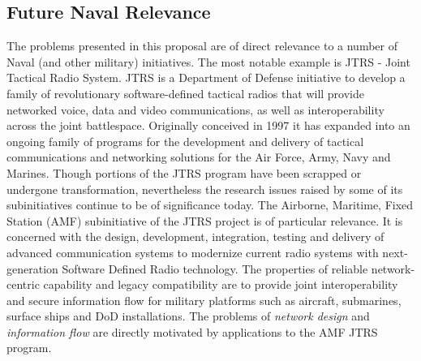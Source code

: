 \subsection{Future Naval Relevance}

The problems presented in this proposal are of direct relevance to a number of Naval (and other military) 
initiatives. The most notable example is JTRS \cite{feickert} - Joint Tactical Radio System. 
JTRS is a Department of 
Defense initiative to develop a family of revolutionary software-defined tactical radios 
that will provide networked voice, data and video communications, as well as interoperability 
across the joint battlespace. Originally conceived in 1997 it has expanded into an ongoing 
family of programs for the development and delivery of tactical communications and networking 
solutions for the Air Force, Army, Navy and Marines. Though portions of the JTRS program have
been scrapped or undergone transformation, nevertheless the research issues raised by some of 
its subinitiatives continue to be of significance today.
The Airborne, Maritime, Fixed Station (AMF) subinitiative of the JTRS project is of particular 
relevance.  It is concerned with the design, development, integration, testing and delivery of
advanced communication systems to modernize current radio systems with next-generation 
Software Defined Radio technology. The properties of reliable network-centric capability and legacy 
compatibility are to provide joint interoperability and secure information flow for 
military platforms such as aircraft, submarines, surface ships and DoD installations.
The problems of {\em network design} and {\em information flow} are directly motivated by
applications to the AMF JTRS program.


